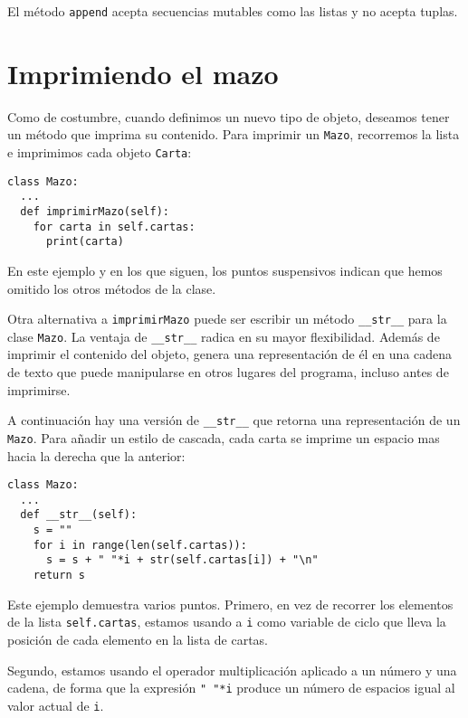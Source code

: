 El método \texttt{append} acepta secuencias mutables como las listas
y no acepta tuplas.

  

\section{Imprimiendo el mazo}

\label{printdeck} 

Como de costumbre, cuando definimos un nuevo tipo de objeto, deseamos
tener un método que imprima su contenido. Para imprimir un \texttt{Mazo},
recorremos la lista e imprimimos cada objeto \texttt{Carta}:
\begin{lstlisting}
class Mazo:
  ...
  def imprimirMazo(self):
    for carta in self.cartas:
      print(carta)
\end{lstlisting}

En este ejemplo y en los que siguen, los puntos suspensivos indican
que hemos omitido los otros métodos de la clase.

Otra alternativa a \texttt{imprimirMazo} puede ser escribir un método
\texttt{\_\_str\_\_} para la clase \texttt{Mazo}. La ventaja de \texttt{\_\_str\_\_}
radica en su mayor flexibilidad. Además de imprimir el contenido del
objeto, genera una representación de él en una cadena de texto que
puede manipularse en otros lugares del programa, incluso antes de
imprimirse.

A continuación hay una versión de \texttt{\_\_str\_\_} que retorna
una representación de un \texttt{Mazo}. Para añadir un estilo de cascada,
cada carta se imprime un espacio mas hacia la derecha que la anterior:
\begin{lstlisting}
class Mazo:
  ...
  def __str__(self):
    s = ""
    for i in range(len(self.cartas)):
      s = s + " "*i + str(self.cartas[i]) + "\n"
    return s
\end{lstlisting}

Este ejemplo demuestra varios puntos. Primero, en vez de recorrer
los elementos de la lista \texttt{self.cartas}, estamos usando a \texttt{i}
como variable de ciclo que lleva la posición de cada elemento en la
lista de cartas.

Segundo, estamos usando el operador multiplicación aplicado a un número
y una cadena, de forma que la expresión \verb+" "*i+ produce un número
de espacios igual al valor actual de \texttt{i}.

